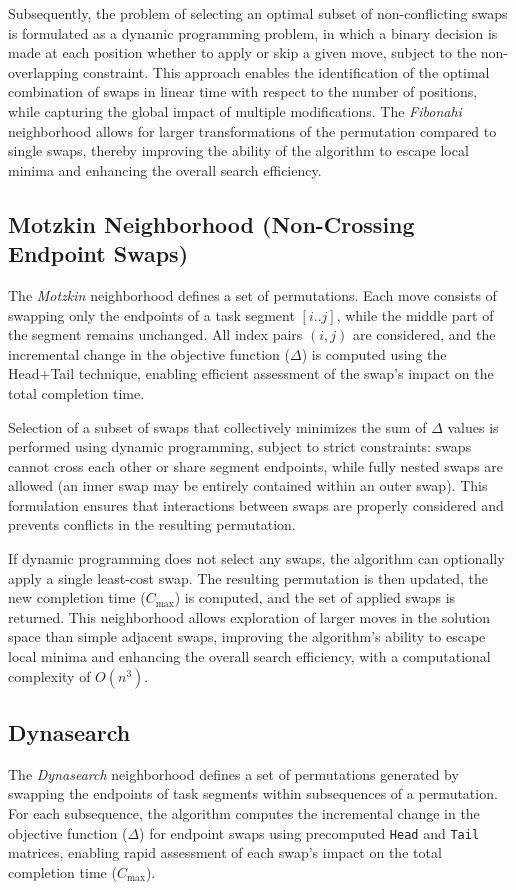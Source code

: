 \documentclass[10pt,twoside,twocolumn,a4paper]{article}
\begin{document}
Subsequently, the problem of selecting an optimal subset of non-conflicting swaps is formulated as a dynamic programming problem, in which a binary decision is made at each position whether to apply or skip a given move, subject to the non-overlapping constraint. This approach enables the identification of the optimal combination of swaps in linear time with respect to the number of positions, while capturing the global impact of multiple modifications. The \emph{Fibonahi} neighborhood allows for larger transformations of the permutation compared to single swaps, thereby improving the ability of the algorithm to escape local minima and enhancing the overall search efficiency.


\subsection{Motzkin Neighborhood (Non-Crossing Endpoint Swaps)}
The \emph{Motzkin} neighborhood defines a set of permutations. Each move consists of swapping only the endpoints of a task segment $[i..j]$, while the middle part of the segment remains unchanged. All index pairs $(i,j)$ are considered, and the incremental change in the objective function ($\Delta$) is computed using the Head+Tail technique, enabling efficient assessment of the swap's impact on the total completion time.

Selection of a subset of swaps that collectively minimizes the sum of $\Delta$ values is performed using dynamic programming, subject to strict constraints: swaps cannot cross each other or share segment endpoints, while fully nested swaps are allowed (an inner swap may be entirely contained within an outer swap). This formulation ensures that interactions between swaps are properly considered and prevents conflicts in the resulting permutation.

If dynamic programming does not select any swaps, the algorithm can optionally apply a single least-cost swap. The resulting permutation is then updated, the new completion time ($C_{\max}$) is computed, and the set of applied swaps is returned. This neighborhood allows exploration of larger moves in the solution space than simple adjacent swaps, improving the algorithm's ability to escape local minima and enhancing the overall search efficiency, with a computational complexity of $O(n^3)$.


\subsection{Dynasearch}
The \emph{Dynasearch} neighborhood defines a set of permutations generated by swapping the endpoints of task segments within subsequences of a permutation. For each subsequence, the algorithm computes the incremental change in the objective function ($\Delta$) for endpoint swaps using precomputed \texttt{Head} and \texttt{Tail} matrices, enabling rapid assessment of each swap's impact on the total completion time ($C_{\max}$).
\end{document}
